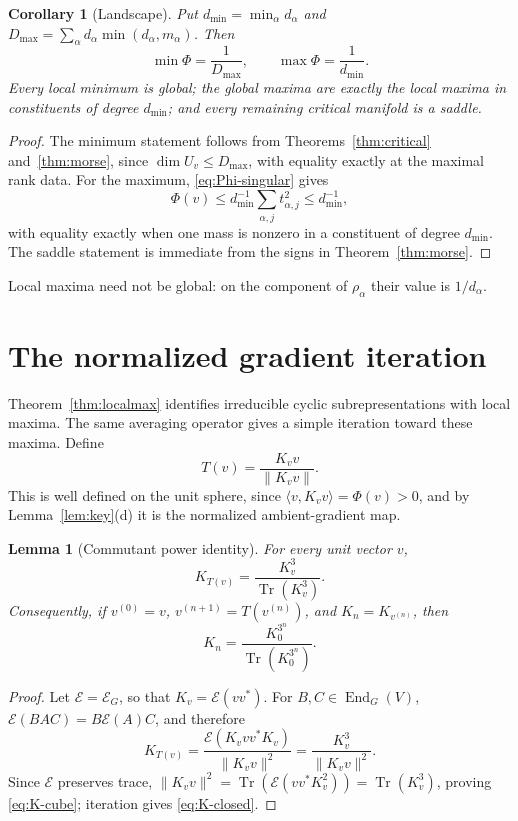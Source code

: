 \documentclass{amsart}
\newtheorem{corollary}[theorem]{Corollary}
\newtheorem{lemma}[theorem]{Lemma}
\theoremstyle{remark}
\DeclareMathOperator{\Tr}{Tr}
\DeclareMathOperator{\End}{End}
\newcommand{\norm}[1]{\lVert #1\rVert}
\begin{document}
\begin{corollary}[Landscape]\label{cor:landscape}
Put $d_{\min}=\min_\alpha d_\alpha$ and
$D_{\max}=\sum_\alpha d_\alpha\min(d_\alpha,m_\alpha)$. Then
\[
 \min\Phi=\frac1{D_{\max}},\qquad \max\Phi=\frac1{d_{\min}}.
\]
Every local minimum is global; the global maxima are exactly the local maxima in constituents of degree
$d_{\min}$; and every remaining critical manifold is a saddle.
\end{corollary}
 
\begin{proof}
The minimum statement follows from Theorems~\ref{thm:critical} and~\ref{thm:morse}, since
$\dim U_v\le D_{\max}$, with equality exactly at the maximal rank data. For the maximum,
\eqref{eq:Phi-singular} gives
\[
 \Phi(v)\le d_{\min}^{-1}\sum_{\alpha,j}t_{\alpha,j}^2\le d_{\min}^{-1},
\]
with equality exactly when one mass is nonzero in a constituent of degree $d_{\min}$. The saddle
statement is immediate from the signs in Theorem~\ref{thm:morse}.
\end{proof}
 
Local maxima need not be global: on the component of $\rho_\alpha$ their value is $1/d_\alpha$.
 
 
\section{The normalized gradient iteration}\label{sec:iter}
 
Theorem~\ref{thm:localmax} identifies irreducible cyclic subrepresentations with local maxima.
The same averaging operator gives a simple iteration toward these maxima. Define
\[
 T(v)=\frac{K_vv}{\norm{K_vv}}.
\]
This is well defined on the unit sphere, since $\langle v,K_vv\rangle=\Phi(v)>0$, and by
Lemma~\ref{lem:key}(d) it is the normalized ambient-gradient map.
 
\begin{lemma}[Commutant power identity]\label{lem:power}
For every unit vector $v$,
\begin{equation}\label{eq:K-cube}
 K_{T(v)}=\frac{K_v^3}{\Tr(K_v^3)}.
\end{equation}
Consequently, if $v^{(0)}=v$, $v^{(n+1)}=T(v^{(n)})$, and $K_n=K_{v^{(n)}}$, then
\begin{equation}\label{eq:K-closed}
 K_n=\frac{K_0^{3^n}}{\Tr(K_0^{3^n})}.
\end{equation}
\end{lemma}
 
\begin{proof}
Let $\mathcal E=\mathcal E_G$, so that $K_v=\mathcal E(vv^*)$. For
$B,C\in\End_G(V)$, $\mathcal E(BAC)=B\mathcal E(A)C$, and therefore
\[
 K_{T(v)}
 =\frac{\mathcal E(K_vvv^*K_v)}{\norm{K_vv}^2}
 =\frac{K_v^3}{\norm{K_vv}^2}.
\]
Since $\mathcal E$ preserves trace,
$\norm{K_vv}^2=\Tr(\mathcal E(vv^*K_v^2))=\Tr(K_v^3)$, proving
\eqref{eq:K-cube}; iteration gives \eqref{eq:K-closed}.
\end{proof}
 
\end{document}
